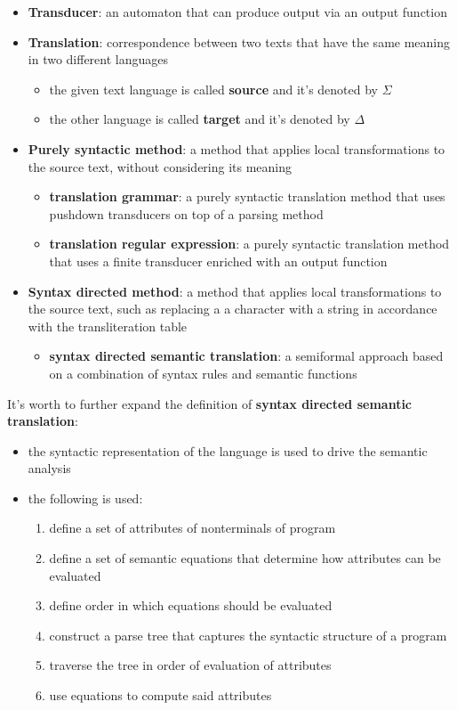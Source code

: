 \documentclass[english]{article}
\begin{document}
\begin{itemize}
  \item \textbf{Transducer}: an automaton that can produce output via an output function
  \item \textbf{Translation}: correspondence between two texts that have the same meaning in two different languages
        \begin{itemize}
          \item the given text language is called \textbf{source} and it's denoted by \(\Sigma\)
          \item the other language is called \textbf{target} and it's denoted by \(\Delta\)
        \end{itemize}
  \item \textbf{Purely syntactic method}: a method that applies local transformations to the source text, without considering its meaning
        \begin{itemize}
          \item \textbf{translation grammar}: a purely syntactic translation method that uses pushdown transducers on top of a parsing method
          \item \textbf{translation regular expression}: a purely syntactic translation method that uses a finite transducer enriched with an output function
        \end{itemize}
  \item \textbf{Syntax directed method}: a method that applies local transformations to the source text, such as replacing a a character with a string in accordance with the transliteration table
        \begin{itemize}
          \item \textbf{syntax directed semantic translation}: a semiformal approach based on a combination of syntax rules and semantic functions
        \end{itemize}
\end{itemize}

It's worth to further expand the definition of \textbf{syntax directed semantic translation}:

\begin{itemize}
  \item the syntactic representation of the language is used to drive the semantic analysis
  \item the following is used:
        \begin{enumerate}[label=\arabic*.]
          \item define a set of attributes of nonterminals of program
          \item define a set of semantic equations that determine how attributes can be evaluated
          \item define order in which equations should be evaluated
          \item construct a parse tree that captures the syntactic structure of a program
          \item traverse the tree in order of evaluation of attributes
          \item use equations to compute said attributes
        \end{enumerate}
\end{itemize}
\end{document}
